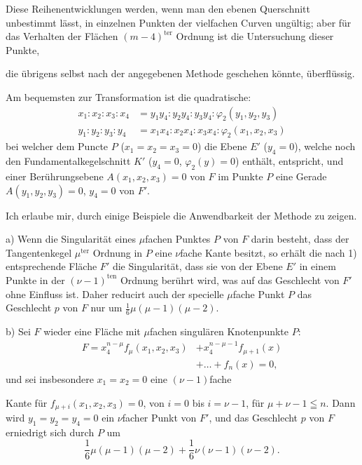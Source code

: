 \documentclass{article}
\begin{document}
Diese Reihenentwicklungen werden, wenn man den ebenen Querschnitt unbestimmt lässt, in einzelnen Punkten der vielfachen Curven ungültig; aber für das Verhalten der Flächen $(m-4)^{\text{ter}}$ Ordnung ist die Untersuchung dieser Punkte,

die übrigens selbst nach der angegebenen Methode geschehen könnte, überflüssig.

Am bequemsten zur Transformation ist die quadratische:
\[
\begin{aligned}
x_1 : x_2 : x_3 : x_4 &= y_1 y_4 : y_2 y_4 : y_3 y_4 : \varphi_2(y_1, y_2, y_3) \\
y_1 : y_2 : y_3 : y_4 &= x_1 x_4 : x_2 x_4 : x_3 x_4 : \varphi_2(x_1, x_2, x_3)
\end{aligned}
\tag{1}
\]
bei welcher dem Puncte $P$ ($x_1 = x_2 = x_3 = 0$) die Ebene $E'$ ($y_4 = 0$), welche noch den Fundamentalkegelschnitt $K'$ ($y_4 = 0$, $\varphi_2(y) = 0$) enthält, entspricht, und einer Berührungsebene $A(x_1, x_2, x_3) = 0$ von $F$ im Punkte $P$ eine Gerade $A(y_1, y_2, y_3) = 0$, $y_4 = 0$ von $F'$.

Ich erlaube mir, durch einige Beispiele die Anwendbarkeit der Methode zu zeigen.

a) Wenn die Singularität eines $\mu$fachen Punktes $P$ von $F$ darin besteht, dass der Tangentenkegel $\mu^{\text{ter}}$ Ordnung in $P$ eine $\nu$fache Kante besitzt, so erhält die nach 1) entsprechende Fläche $F'$ die Singularität, dass sie von der Ebene $E'$ in einem Punkte in der $(\nu-1)^{\text{ten}}$ Ordnung berührt wird, was auf das Geschlecht von $F'$ ohne Einfluss ist. Daher reducirt auch der specielle $\mu$fache Punkt $P$ das Geschlecht $p$ von $F$ nur um $\frac{1}{6}\mu(\mu-1)(\mu-2)$.

b) Sei $F$ wieder eine Fläche mit $\mu$fachen singulären Knotenpunkte $P$:
\[
\begin{aligned}
F = x_4^{n-\mu} f_\mu(x_1, x_2, x_3) &+ x_4^{n-\mu-1} f_{\mu+1}(x) \\
&+ \ldots + f_n(x) = 0,
\end{aligned}
\tag{2}
\]
und sei insbesondere $x_1 = x_2 = 0$ eine $(\nu-1)$fache

Kante für $f_{\mu+i}(x_1, x_2, x_3) = 0$, von $i = 0$ bis $i = \nu - 1$, für $\mu + \nu - 1 \leqq n$. Dann wird $y_1 = y_2 = y_4 = 0$ ein $\nu$facher Punkt von $F'$, und das Geschlecht $p$ von $F$ erniedrigt sich durch $P$ um
\[ \frac{1}{6}\mu(\mu-1)(\mu-2) + \frac{1}{6}\nu(\nu-1)(\nu-2). \]
\end{document}
